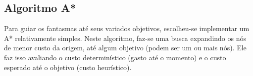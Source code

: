 \documentclass[a4paper]{scrartcl}
\begin{document}
%
%
%
%

\subsection{Algoritmo A*}

Para guiar os fantasmas até seus variados objetivos, escolheu-se implementar um A* relativamente simples. Neste algoritmo, faz-se uma busca expandindo os nós de menor custo da origem, até algum
objetivo (podem ser um ou mais nós). Ele faz isso avaliando o custo determinístico (gasto até o momento) e o custo esperado até o objetivo (custo heurístico).
\end{document}
